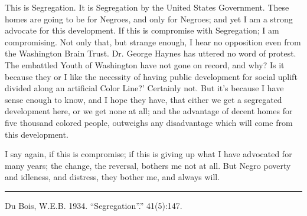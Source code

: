 \documentclass[letterpaper,10pt,english]{jupyterBook}
\begin{document}
\sphinxAtStartPar
This is Segregation. It is Segregation by the United States Government. These homes are going to be for Negroes, and only for Negroes; and yet I am a strong advocate for this development. If this is compromise with Segregation; I am compromising. Not only that, but strange enough, I hear no opposition even from the Washington Brain Trust. Dr. George Haynes has uttered no word of protest. The embattled Youth of Washington have not gone on record, and why? Is it because they or I like the necessity of having public development for social uplift divided along an artificial Color Line?’ Certainly not. But it’s because I have sense enough to know, and I hope they have, that either we get a segregated development here, or we get none at all; and the advantage of decent homes for five thousand colored people, outweighs any disadvantage which will come from this development.

\sphinxAtStartPar
I say again, if this is compromise; if this is giving up what I have advocated for many years; the change, the reversal, bothers me not at all. But Negro poverty and idleness, and distress, they bother me, and always will.


\bigskip\hrule\bigskip


\sphinxAtStartPar
{} Du Bois, W.E.B. 1934. “Segregation”.”   41(5):147.
\end{document}
